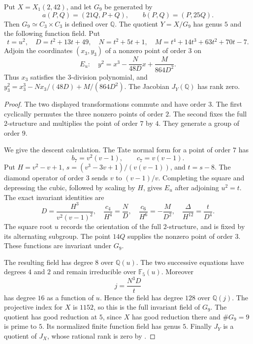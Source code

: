 \begin{lemma}\label{lem:decic242-quotient5}
Put $X=X_1(2,42)$, and let $G_9$ be generated by
\[
 a(P,Q)=(21Q,P+Q),\qquad b(P,Q)=(P,25Q).
\]
Then $G_9\simeq C_3\times C_3$ is defined over $\mathbb Q$.
The quotient $Y=X/G_9$ has genus $5$ and the following function
field. Put
\[
 t=u^2,\quad D=t^2+13t+49,\quad N=t^2+5t+1,\quad
 M=t^4+14t^3+63t^2+70t-7.
\]
Adjoin the coordinates $(x_3,y_3)$ of a nonzero point of order $3$
on
\[
 E_u:\quad y^2=x^3-\frac{N}{48D}x+\frac{M}{864D^2}.
\]
Thus $x_3$ satisfies the $3$-division polynomial, and
$y_3^2=x_3^3-Nx_3/(48D)+M/(864D^2)$.
The Jacobian $J_Y(\mathbb Q)$ has rank zero.
\end{lemma}
\begin{proof}
The two displayed transformations commute and have order $3$.
The first cyclically permutes the three nonzero points of order $2$.
The second fixes the full $2$-structure and multiplies the point
of order $7$ by $4$. They generate a group of order $9$.

We give the descent calculation. The Tate normal form for a point
of order $7$ has
\[
 b_7=v^2(v-1),\qquad c_7=v(v-1).
\]
Put $H=v^2-v+1$, $s=(v^3-3v+1)/(v(v-1))$, and $t=s-8$.
The diamond operator of order $3$ sends $v$ to $(v-1)/v$.
Completing the square and depressing the cubic, followed by
scaling by $H$, gives $E_u$ after adjoining $u^2=t$.
The exact invariant identities are
\[
 D=\frac{H^3}{v^2(v-1)^2},\quad
 \frac{c_4}{H^4}=\frac ND,\quad
 \frac{c_6}{H^6}=-\frac M{D^2},\quad
 \frac{\Delta}{H^{12}}=\frac{t}{D^4}.
\]
The square root $u$ records the orientation of the full
$2$-structure, and is fixed by its alternating subgroup.
The point $14Q$ supplies the nonzero point of order $3$.
These functions are invariant under $G_9$.

The resulting field has degree $8$ over $\mathbb Q(u)$.
The two successive equations have degrees $4$ and $2$ and remain
irreducible over $\mathbb F_5(u)$.
Moreover
\[
 j=\frac{N^3D}{t}
\]
has degree $16$ as a function of $u$. Hence the field has degree
$128$ over $\mathbb Q(j)$. The projective index for $X$ is $1152$,
so this is the full invariant field of $G_9$.
The quotient has good reduction at $5$, since $X$ has good
reduction there and $\#G_9=9$ is prime to $5$.
Its normalized finite function field has genus $5$.
Finally $J_Y$ is a quotient of $J_X$, whose rational rank is zero
by \cite[Theorem~3.1]{DEHMZ}.
\end{proof}

